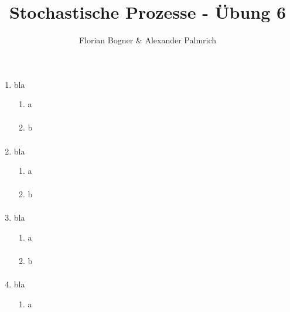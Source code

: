\documentclass[a4paper,11pt,notitlepage,fullpage]{article}
\begin{document}
\author{Florian Bogner \& Alexander Palmrich}
\title{Stochastische Prozesse - Übung 6}
\maketitle

\begin{enumerate}
\setcounter{enumi}{00}


\item bla
\begin{enumerate}
\item a
\begin{align*}
\end{align*}

\item b
\begin{align*}
\end{align*}
\end{enumerate}


\item bla
\begin{enumerate}
\item a
\begin{align*}
\end{align*}

\item b
\begin{align*}
\end{align*}
\end{enumerate}

\item bla
\begin{enumerate}
\item a
\begin{align*}
\end{align*}

\item b
\begin{align*}
\end{align*}
\end{enumerate}

\item bla
\begin{enumerate}
\item a
\begin{align*}
\end{align*}


\end{enumerate}
\end{enumerate}
\end{document}
